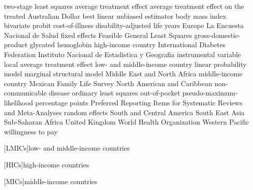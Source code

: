\begin{acronym}
 {two-stage least squares}
 {average treatment effect}
 {average treatment effect on the treated}
 {Australian Dollar}
 {best linear unbiased estimator}
 {body mass index}  
 {bivariate probit}
 {cost-of-illness} 
 {disability-adjusted life years}
 {Europe}
 {La Encuesta Nacional de Salud}
 {fixed effects}  
 {Feasible General Least Squares}
 {gross-domestic-product} 
 {glycated hemoglobin}  
 {high-income country} 
 {International Diabetes Federation}
 {Instituto Nacional de Estadistica y Geografia} 
 {instrumental variable}
 {local average treatment effect}
 {low- and middle-income country} 
 {linear probability model}
 {marginal structural model} 
 {Middle East and North Africa}
 {middle-income country}  
 {Mexican Family Life Survey}
 {North American and Caribbean}
 {non-communicable disease}
 {ordinary least squares}
 {out-of-pocket}   
 {pseudo-maximum-likelihood}
 {percentage points}
 {Preferred Reporting Items for Systematic Reviews and Meta-Analyses}
 {random effects}
 {South and Central America}
 {South East Asia}
 {Sub-Saharan Africa}
 {United Kingdom}
 {World Health Organization}
 {Western Pacific}
 {willingness to pay
}    

\end{acronym}

[LMICs]{low- and middle-income countries}  

[HICs]{high-income countries}

[MICs]{middle-income countries} 